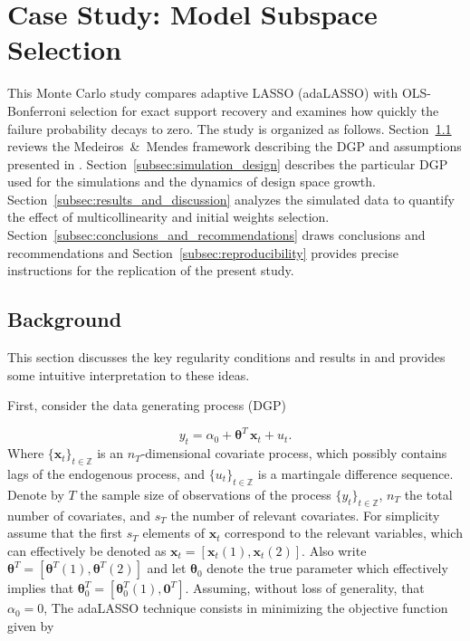 \documentclass[10pt,a4paper,oneside]{article}
\newcommand{\Z}{\mathbb{Z}}
\begin{document}
\clearpage
\section{Case Study: Model Subspace Selection}
\label{ap:case_study_var_selection}

This Monte Carlo study compares adaptive LASSO (adaLASSO) \citep{Zou01122006,MEDEIROS2016255} with OLS-Bonferroni selection for exact support recovery and examines how quickly the failure probability decays to zero. The study is organized as follows. Section~\ref{subsec:background} reviews the Medeiros~\&~Mendes framework describing the DGP and assumptions presented in \cite{MEDEIROS2016255}.  Section~\ref{subsec:simulation_design} describes the particular DGP used for the simulations and the dynamics of design space growth. Section~\ref{subsec:results_and_discussion} analyzes the simulated data to quantify the effect of multicollinearity and initial weights selection. Section~\ref{subsec:conclusions_and_recommendations} draws conclusions and recommendations and Section~\ref{subsec:reproducibility} provides precise instructions for the replication of the present study.

\subsection{Background}
\label{subsec:background}

This section discusses the key regularity conditions and results in \cite{MEDEIROS2016255} and provides some intuitive interpretation to these ideas.

First, consider the data generating process (DGP) 

\begin{equation}
    y_t = \alpha_0 + \boldsymbol{\theta}^T\,\mathbf{x}_t + u_t.
    \label{eq:dgp_medmen}
\end{equation}
Where $\{\mathbf{x}_t\}_{t \in \Z}$ is an $n_T$-dimensional covariate process, which possibly contains lags of the endogenous process, and $\{u_t\}_{t \in \Z}$ is a martingale difference sequence. Denote by $T$ the sample size of observations of the process $\{y_t \}_{t\in \Z}$, $n_T$ the total number of covariates, and $s_T$ the number of relevant covariates. For simplicity assume that the first $s_T$ elements of $\mathbf{x}_t$ correspond to the relevant variables, which can effectively be denoted as $\mathbf{x}_t = [\mathbf{x}_t(1), \mathbf{x}_t(2)]$. Also write $\boldsymbol{\theta}^T = [\boldsymbol{\theta}^T(1), \boldsymbol{\theta}^T(2)]$ and let $\boldsymbol{\theta}_0$ denote the true parameter which effectively implies that $\boldsymbol{\theta}_0^T = [\boldsymbol{\theta}_0^T(1), \mathbf{0}^T]$. Assuming, without loss of generality, that $\alpha_0 = 0$, The adaLASSO technique consists in minimizing the objective function given by
\end{document}
